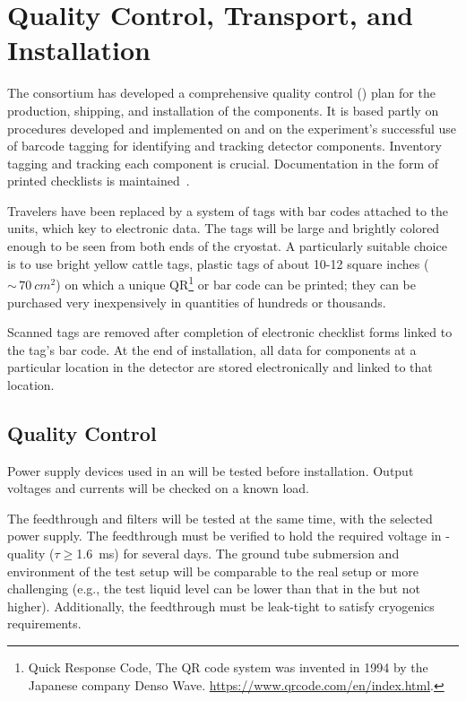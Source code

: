 \section{Quality Control, Transport, and Installation}
\label{sec:fdsp-hv-transport}

The  consortium has developed a comprehensive quality control ()
plan for the production, shipping, and installation of the   components. %
It is based partly on  procedures developed and implemented on  and on the  experiment's successful use of barcode tagging for identifying and tracking detector components.  Inventory tagging and tracking each component is crucial. Documentation in the form of printed checklists is maintained~\cite{bib:docdb10452}. 

Travelers have been replaced by a system of tags with bar codes attached to the units, which key to electronic  data. The tags will be large and brightly colored enough to be seen from both ends of the cryostat.
A particularly suitable choice is to use 
bright yellow cattle tags, plastic tags of about 10-12 square inches ($\sim\,\SI{70}{cm^{2}}$) on which a unique QR\footnote{Quick Response Code, The QR\texttrademark{} code system was invented in 1994 by the Japanese company Denso Wave. \url{https://www.qrcode.com/en/index.html}.} or bar code can be printed; they can be purchased very inexpensively in quantities of hundreds or thousands.


Scanned tags are removed after completion of electronic checklist forms linked to the tag's bar code.  At the end of  installation, all  data for components at a particular location in the detector are stored electronically and linked to that location.



\subsection{Quality Control}
\label{sec:fdsp-hv-transport-QC}

Power supply devices used in an  will be tested before installation.  Output voltages and currents will be checked on a known load. 

The feedthrough and filters will be tested at the same time, with the selected power supply.  The feedthrough must be verified to hold the required voltage in -quality  ($\tau\geq$\SI{1.6}{ms}) for several days.  The ground tube submersion and \efield{} environment of the test setup will be comparable to the real  setup or more challenging (e.g., the test liquid level can be lower than that in the  but not higher).  Additionally, the feedthrough must be leak-tight to satisfy cryogenics requirements.

